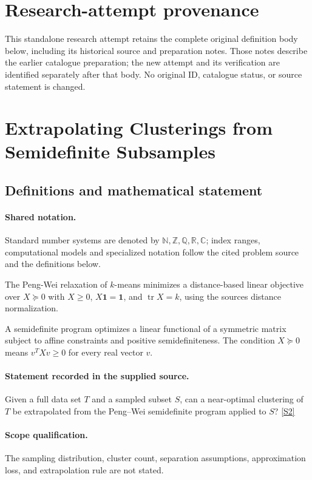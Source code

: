\documentclass[11pt]{article}
\begin{document}
\section*{Research-attempt provenance}
This standalone research attempt retains the complete original definition body below,
including its historical source and preparation notes. Those notes describe the
earlier catalogue preparation; the new attempt and its verification are identified
separately after that body. No original ID, catalogue status, or source statement is changed.

\section{Extrapolating Clusterings from Semidefinite Subsamples}\label{statement}

\subsection{Definitions and mathematical statement}

\paragraph{Shared notation.}Standard number systems are denoted by $\mathbb N,\mathbb Z,\mathbb Q,\mathbb R,\mathbb C$; index ranges, computational models and specialized notation follow the cited problem source and the definitions below.


The Peng-Wei relaxation of $k$-means minimizes a distance-based linear objective over $X\succeq0$ with $X\geq0$, $X\mathbf1=\mathbf1$, and $\operatorname{tr}X=k$, using the source\textquotesingle s distance normalization.

A semidefinite program optimizes a linear functional of a symmetric matrix subject to affine constraints and positive semidefiniteness. The condition $X\succeq0$ means $v^TXv\geq0$ for every real vector $v$.
\paragraph{Statement recorded in the supplied source.}
Given a full data set $T$ and a sampled subset $S$, can a near-optimal clustering of $T$ be extrapolated from the Peng–Wei semidefinite program applied to $S$? \href{https://doi.org/10.4171/owr/2018/14}{[S2]}
\paragraph{Scope qualification.}
The sampling distribution, cluster count, separation assumptions, approximation loss, and extrapolation rule are not stated.
\end{document}
